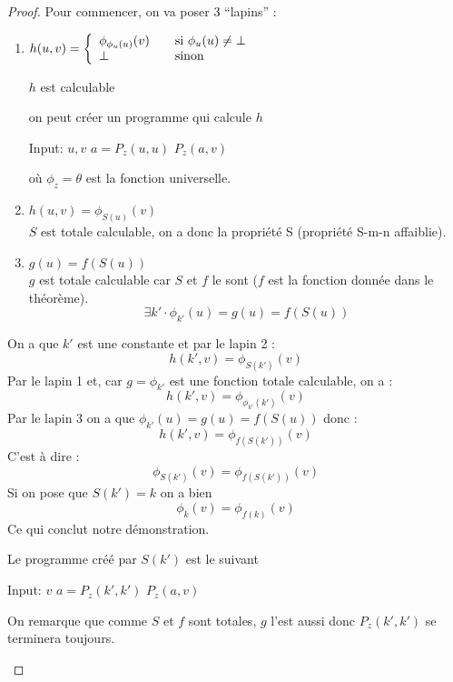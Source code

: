 \begin{proof}
Pour commencer, on va poser 3 ``lapins'' :
\begin{enumerate}

	\item
	$ h(u,v) = \left\{
	\begin{array}{l l}
		\phi_{\phi_{u}(u)}(v) & \quad \text{si $\phi_u(u)\neq \bot$}\\
    	\bot & \quad \text{sinon}
	\end{array} \right.$

		$h$ est calculable
		\begin{myrem}
			on peut créer un programme qui calcule $h$
            \begin{algorithmic}
              \STATE Input: $u,v$
              \STATE $a = P_z(u,u)$
              \STATE $P_z(a,v)$
            \end{algorithmic}
            où $\phi_z = \theta$ est la fonction universelle.
		\end{myrem}

	\item $h(u,v)=\phi_{S(u)}(v)$\\
	 $S$ est totale calculable, on a donc la propriété S (propriété S-m-n affaiblie).

	\item $g(u)=f(S(u))$\\
	 $g$ est totale calculable car $S$ et $f$ le sont ($f$
		est la fonction donnée dans le théorème).
		\[ \exists k' \cdot \phi_{k'}(u) =g(u)=f(S(u)) \]
\end{enumerate}
On a que $k'$ est une constante et par le lapin 2 :
\[h(k',v) = \phi_{S(k')}(v)\]
Par le lapin 1 et, car $g=\phi_{k'}$ est une fonction totale calculable, on a :
\[h(k',v) = \phi_{\phi_{k'}(k')}(v)\]
Par le lapin 3 on a que $\phi_{k'}(u) = g(u)=f(S(u))$ donc :
\[h(k',v) = \phi_{f(S(k'))}(v)\]
C'est à dire :
\[ \phi_{S(k')}(v) =\phi_{f(S(k'))}(v) \]
Si on pose que $S(k')=k$ on a bien
\[ \phi_{k}(v) = \phi_{f(k)}(v) \]
Ce qui conclut notre démonstration.
		\begin{myrem}
          Le programme créé par $S(k')$ est le suivant
          \begin{algorithmic}
            \STATE Input: $v$
            \STATE $a = P_z(k',k')$
            \STATE $P_z(a,v)$
          \end{algorithmic}
          On remarque que comme $S$ et $f$ sont totales,
          $g$ l'est aussi donc $P_z(k',k')$ se terminera toujours.


\end{myrem}
\end{proof}
